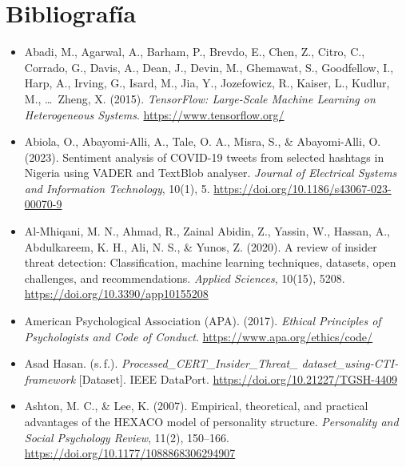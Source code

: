 \documentclass[IB]{TFUOC}%
\begin{document}



\chapter{Bibliografía}

\begin{itemize}

    \item Abadi, M., Agarwal, A., Barham, P., Brevdo, E., Chen, Z., Citro, C., 
    Corrado, G., Davis, A., Dean, J., Devin, M., Ghemawat, S., Goodfellow, I., 
    Harp, A., Irving, G., Isard, M., Jia, Y., Jozefowicz, R., Kaiser, L., 
    Kudlur, M., \ldots\ Zheng, X. (2015). \textit{TensorFlow: Large-Scale 
    Machine Learning on Heterogeneous Systems}. 
    \url{https://www.tensorflow.org/}

    \item Abiola, O., Abayomi-Alli, A., Tale, O. A., Misra, S., \& 
    Abayomi-Alli, O. (2023). Sentiment analysis of COVID-19 tweets from 
    selected hashtags in Nigeria using VADER and TextBlob analyser. 
    \textit{Journal of Electrical Systems and Information Technology}, 
    10(1), 5. \url{https://doi.org/10.1186/s43067-023-00070-9}

    \item Al-Mhiqani, M. N., Ahmad, R., Zainal Abidin, Z., Yassin, W., 
    Hassan, A., Abdulkareem, K. H., Ali, N. S., \& Yunos, Z. (2020). 
    A review of insider threat detection: Classification, machine learning 
    techniques, datasets, open challenges, and recommendations. 
    \textit{Applied Sciences}, 10(15), 5208. 
    \url{https://doi.org/10.3390/app10155208}

    \item American Psychological Association (APA). (2017). \textit{Ethical Principles of Psychologists and Code of Conduct}.
    \url{https://www.apa.org/ethics/code/}

    \item Asad Hasan. (s.\,f.). \textit{Processed\_CERT\_Insider\_Threat\_%
    dataset\_using-CTI-framework} [Dataset]. IEEE DataPort. 
    \url{https://doi.org/10.21227/TGSH-4409}

    \item Ashton, M. C., \& Lee, K. (2007). Empirical, theoretical, and practical advantages of the HEXACO model of personality structure. \textit{Personality and Social Psychology Review}, 11(2), 150--166. 
    \url{https://doi.org/10.1177/1088868306294907}


\end{itemize}
\end{document}
